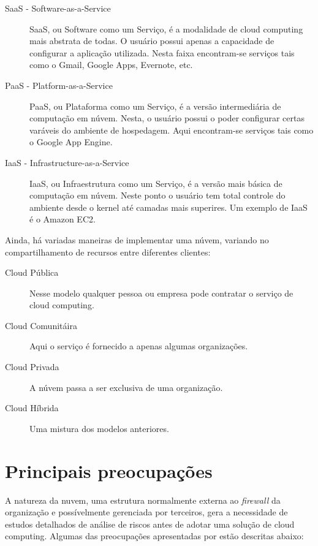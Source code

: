 \documentclass[brazil,12pt]{article}
\begin{document}
\begin{description}
  \item[SaaS - Software-as-a-Service] SaaS, ou Software como um Serviço, é a
  modalidade de cloud computing mais abstrata de todas. O usuário possui apenas
  a capacidade de configurar a aplicação utilizada. Nesta faixa encontram-se
  serviços tais como o Gmail, Google Apps, Evernote, etc.
  \item[PaaS - Platform-as-a-Service] PaaS, ou Plataforma como um Serviço, é a
  versão intermediária de computação em núvem. Nesta, o usuário possui o poder
  configurar certas varáveis do ambiente de hospedagem. Aqui encontram-se
  serviços tais como o Google App Engine.
  \item[IaaS - Infrastructure-as-a-Service] IaaS, ou Infraestrutura como um
  Serviço, é a versão mais básica de computação em núvem. Neste ponto o usuário
  tem total controle do ambiente desde o kernel até camadas mais superires. Um
  exemplo de IaaS é o Amazon EC2.
\end{description}

Ainda, há variadas maneiras de implementar uma núvem, variando no
compartilhamento de recursos entre diferentes clientes:

\begin{description}
  \item[Cloud Pública] Nesse modelo qualquer pessoa ou empresa pode contratar o
  serviço de cloud computing.
  \item[Cloud Comunitáira] Aqui o serviço é fornecido a apenas algumas
  organizações.
  \item[Cloud Privada] A núvem passa a ser exclusiva de uma organização.
  \item[Cloud Híbrida] Uma mistura dos modelos anteriores.
\end{description}

\section{Principais preocupações}
A natureza da nuvem, uma estrutura normalmente externa ao \emph{firewall} da
organização e possívelmente gerenciada por terceiros, gera a necessidade de
estudos detalhados de análise de riscos antes de adotar uma solução de cloud
computing. Algumas das preocupações apresentadas por
\cite{controlling-data-in-cloud} estão descritas abaixo:
\end{document}
